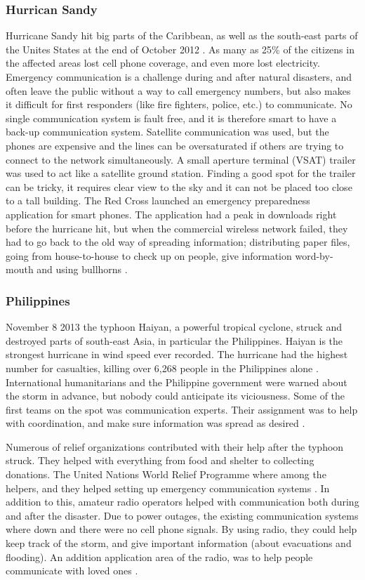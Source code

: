 \subsubsection{Hurrican Sandy}
Hurricane Sandy hit big parts of the Caribbean, as well as the south-east parts of the Unites States at the end of October 2012 \cite{WikiSandy}. As many as 25\% of the citizens in the affected areas lost cell phone coverage, and even more lost electricity. Emergency communication is a challenge during and after natural disasters, and often leave the public without a way to call emergency numbers, but also makes it difficult for first responders (like fire fighters, police, etc.) to communicate. No single communication system is fault free, and it is therefore smart to have a back-up communication system. Satellite communication was used, but the phones are expensive and the lines can be oversaturated if others are trying to connect to the network simultaneously. A small aperture terminal (VSAT) trailer was used to act like a satellite ground station. Finding a good spot for the trailer can be tricky, it requires clear view to the sky and it can not be placed too close to a tall building. The Red Cross launched an emergency preparedness application for smart phones. The application had a peak in downloads right before the hurricane hit, but when the commercial wireless network failed, they had to go back to the old way of spreading information; distributing paper files, going from house-to-house to check up on people, give information word-by-mouth and using bullhorns \cite{hurricaneSandy}.

\subsubsection{Philippines}
November 8 2013 the typhoon Haiyan, a powerful tropical cyclone, struck and destroyed parts of south-east Asia, in particular the Philippines. Haiyan is the strongest hurricane in wind speed ever recorded. The hurricane had the highest number for casualties, killing over 6,268 people in the Philippines alone \cite{wikiHaiyan}. International humanitarians and the Philippine government were warned about the storm in advance, but nobody could anticipate its viciousness. Some of the first teams on the spot was communication experts. Their assignment was to help with coordination, and make sure information was spread as desired \cite{disasterResponse}.

Numerous of relief organizations contributed with their help after the typhoon struck. They helped with everything from food and shelter to collecting donations. The United Nations World Relief Programme where among the helpers, and they helped setting up emergency communication systems \cite{philippines}. In addition to this, amateur radio operators helped with communication both during and after the disaster. Due to power outages, the existing communication systems where down and there were no cell phone signals. By using radio, they could help keep track of the storm, and give important information (about evacuations and flooding). An addition application area of the radio, was to help people communicate with loved ones \cite{philippinesradio}. 


